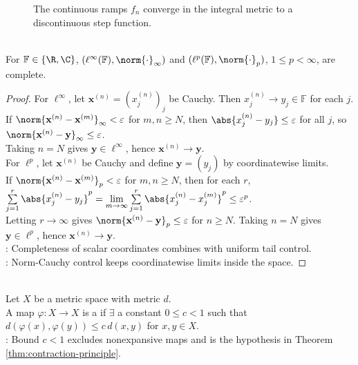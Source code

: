 \begin{figure}[H]
  \centering
  
  \caption{The continuous ramps $f_n$ converge in the integral metric to a
  discontinuous step function.}
  \label{fig:continuous-functions-integral-metric-not-complete}
\end{figure}

\begin{example} \label{ex:sequence-spaces-complete} \\
For $\mathbb{F}\in\{\R,\C\}$, $(\ell^\infty(\mathbb{F}),\norm{\cdot}_\infty)$ and $(\ell^p(\mathbb{F}),\norm{\cdot}_p)$, $1\leq p<\infty$, are complete.
\begin{proof}
For $\ell^\infty$, let $\mathbf{x}^{(n)}=(x_j^{(n)})_j$ be Cauchy. Then $x_j^{(n)}\to y_j\in\mathbb{F}$ for each $j$.\\
If $\norm{\mathbf{x}^{(n)}-\mathbf{x}^{(m)}}_\infty<\varepsilon$ for $m,n\geq N$, then $\abs{x_j^{(n)}-y_j}\leq\varepsilon$ for all $j$, so $\norm{\mathbf{x}^{(n)}-\mathbf{y}}_\infty\leq\varepsilon$.\\
Taking $n=N$ gives $\mathbf{y}\in\ell^\infty$, hence $\mathbf{x}^{(n)}\to\mathbf{y}$.\\
For $\ell^p$, let $\mathbf{x}^{(n)}$ be Cauchy and define $\mathbf{y}=(y_j)$ by coordinatewise limits.\\
If $\norm{\mathbf{x}^{(n)}-\mathbf{x}^{(m)}}_p<\varepsilon$ for $m,n\geq N$, then for each $r$, $\sum\limits_{j=1}^{r}\abs{x_j^{(n)}-y_j}^{p}=\lim\limits_{m\to\infty}\sum\limits_{j=1}^{r}\abs{x_j^{(n)}-x_j^{(m)}}^{p}\leq\varepsilon^p$.\\
Letting $r\to\infty$ gives $\norm{\mathbf{x}^{(n)}-\mathbf{y}}_p\leq\varepsilon$ for $n\geq N$. Taking $n=N$ gives $\mathbf{y}\in\ell^p$, hence $\mathbf{x}^{(n)}\to\mathbf{y}$.\\
: Completeness of scalar coordinates combines with uniform tail control.\\
: Norm-Cauchy control keeps coordinatewise limits inside the space.
\end{proof}
\end{example}

\begin{definition} \label{def:contraction-mapping} \\
Let $X$ be a metric space with metric $d$.\\
A map $\varphi:X\to X$ is a  if $\exists$ a constant $0\leq c<1$ such that $d(\varphi(x),\varphi(y))\leq c\,d(x,y)$ for $x,y\in X$.\\
: Bound $c<1$ excludes nonexpansive maps and is the hypothesis in Theorem \ref{thm:contraction-principle}.
\end{definition}

